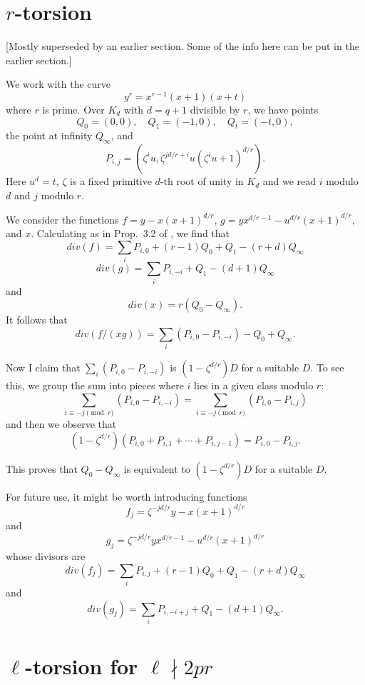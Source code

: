 \documentclass[reqno]{amsart}
\theoremstyle{definition}
\theoremstyle{remark}
\begin{document}


\section{$r$-torsion}
[Mostly superseded by an earlier section. Some of the info here can be put in 
the earlier section.]

We work with the curve
$$y^r=x^{r-1}(x+1)(x+t)$$
where $r$ is prime.  Over $K_d$ with $d=q+1$ divisible by $r$, we have points
$$Q_0=(0,0),\quad Q_1=(-1,0),\quad Q_t=(-t,0),$$
the point at infinity $Q_\infty$, and
$$P_{i,j}=\left(\zeta^iu,\zeta^{jd/r+i}u(\zeta^iu+1)^{d/r}\right).$$
Here $u^d=t$, $\zeta$ is a fixed primitive $d$-th root of unity in
$K_d$ and we read $i$ modulo $d$ and $j$ modulo $r$.

We consider the functions $f=y-x(x+1)^{d/r}$,
$g=yx^{d/r-1}-u^{d/r}(x+1)^{d/r}$, and $x$.  Calculating as in
Prop.~3.2 of \cite{Legendre}, 
we find that
$$div(f)=\sum_iP_{i,0}+(r-1)Q_0+Q_1-(r+d)Q_\infty$$
$$div(g)=\sum_iP_{i,-i}+Q_1-(d+1)Q_\infty$$
and
$$div(x)=r\left(Q_0-Q_\infty\right).$$
It follows that 
$$div(f/(xg))=\sum_i\left(P_{i,0}-P_{i,-i}\right)-Q_0+Q_\infty.$$

Now I claim that $\sum_i\left(P_{i,0}-P_{i,-i}\right)$ is
$(1-\zeta^{d/r})D$ for a suitable $D$.  To see this, we group the sum
into pieces where $i$ lies in a given class modulo $r$:
$$\sum_{i\equiv -j\pmod r}\left(P_{i,0}-P_{i,-i}\right)
=\sum_{i\equiv -j\pmod r}\left(P_{i,0}-P_{i,j}\right)$$
and then we observe that 
$$(1-\zeta^{d/r})\left(P_{i,0}+P_{i,1}+\cdots+P_{i,j-1}\right)
=P_{i,0}-P_{i,j}.$$

This proves that $Q_0-Q_\infty$ is equivalent to $(1-\zeta^{d/r})D$
for a suitable $D$.

For future use, it might be worth introducing functions
$$f_j=\zeta^{-jd/r}y-x(x+1)^{d/r}$$
and 
$$g_j=\zeta^{-jd/r}yx^{d/r-1}-u^{d/r}(x+1)^{d/r}$$
whose divisors are
$$div(f_j)=\sum_iP_{i,j}+(r-1)Q_0+Q_1-(r+d)Q_\infty$$
and
$$div(g_j)=\sum_iP_{i,-i+j}+Q_1-(d+1)Q_\infty.$$


\section{$\ell$-torsion for $\ell \nmid 2pr$}
\end{document}
